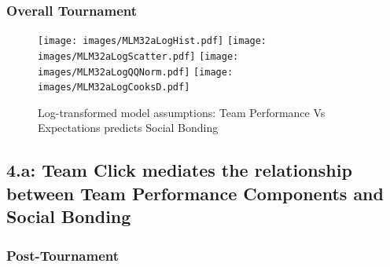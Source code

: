 {      \subsubsection{Overall Tournament\label{app8:MLM32a}}


       

       






      \begin{figure}[htbp]
        \texttt{[image: images/MLM32aLogHist.pdf]}
        \texttt{[image: images/MLM32aLogScatter.pdf]}
        \texttt{[image: images/MLM32aLogQQNorm.pdf]}
        \texttt{[image: images/MLM32aLogCooksD.pdf]}
        \caption{Log-transformed model assumptions: Team Performance Vs Expectations predicts Social Bonding}
        \label{fig:MLM3bLogAssumptions}
      \end{figure}







        \subsection{4.a: Team Click mediates the relationship between Team Performance Components and Social Bonding}

      \subsubsection{Post-Tournament}


}
